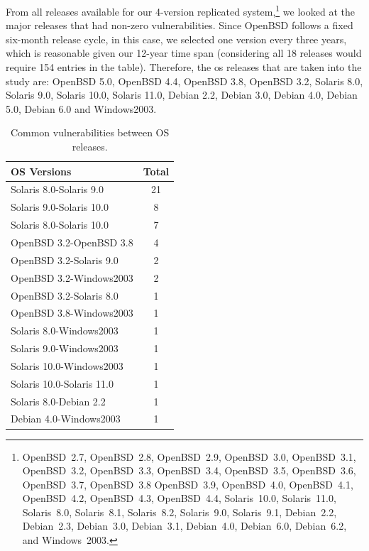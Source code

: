 From all releases available for our 4-version replicated system,\footnote[1]{OpenBSD~2.7, OpenBSD~2.8, OpenBSD~2.9, OpenBSD~3.0, OpenBSD~3.1, OpenBSD~3.2, OpenBSD~3.3, OpenBSD~3.4, OpenBSD~3.5, OpenBSD~3.6, OpenBSD~3.7, OpenBSD~3.8 OpenBSD~3.9, OpenBSD~4.0, OpenBSD~4.1, OpenBSD~4.2, OpenBSD~4.3, OpenBSD~4.4,   Solaris~10.0, Solaris~11.0, Solaris~8.0, Solaris~8.1, Solaris~8.2, Solaris~9.0, Solaris~9.1, Debian~2.2, Debian~2.3, Debian~3.0,   Debian~3.1, Debian~4.0, Debian~6.0, Debian~6.2, and Windows~2003.} we looked at the major releases that had non-zero vulnerabilities. 
Since OpenBSD follows a fixed six-month release cycle, in this case, we selected one version every three years, which is reasonable given our 12-year time span (considering all 18 releases would require 154 entries in the table). 
Therefore, the \gls{os} releases that are taken into the study are: OpenBSD 5.0, OpenBSD 4.4, OpenBSD 3.8, OpenBSD 3.2, Solaris 8.0, Solaris 9.0, Solaris 10.0, Solaris 11.0, Debian 2.2, Debian 3.0, Debian 4.0, Debian 5.0, Debian 6.0 and Windows2003.

\begin{table}[!ht]
\begin{center}
{\scriptsize
\begin{tabular}{|l|c|}\hline
\textbf{OS Versions} & Total  \\\hline\hline
Solaris 8.0-Solaris 9.0 	&21\\
Solaris 9.0-Solaris 10.0 	&8\\
Solaris 8.0-Solaris 10.0 	&7\\
OpenBSD 3.2-OpenBSD 3.8 & 4 \\
OpenBSD 3.2-Solaris 9.0 & 2 \\
OpenBSD 3.2-Windows2003 & 2 \\
OpenBSD 3.2-Solaris 8.0 & 1 \\
OpenBSD 3.8-Windows2003 & 1 \\
Solaris 8.0-Windows2003 & 1 \\
Solaris 9.0-Windows2003 & 1 \\
Solaris 10.0-Windows2003 & 1 \\
Solaris 10.0-Solaris 11.0	& 1 \\
Solaris 8.0-Debian 2.2 &	1 \\
Debian 4.0-Windows2003 & 1 \\\hline
\end{tabular}
\caption{Common vulnerabilities between OS releases.}
\label{tab:vulns_releases}
}
\end{center}
\end{table}

